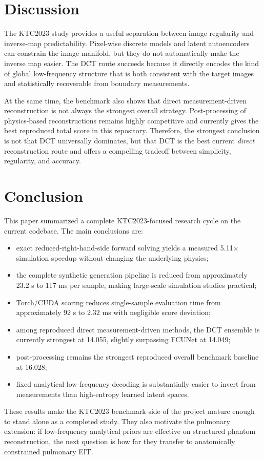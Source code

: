\documentclass[11pt,a4paper]{article}
\begin{document}
\section{Discussion}
The KTC2023 study provides a useful separation between image regularity and inverse-map predictability. Pixel-wise discrete models and latent autoencoders can constrain the image manifold, but they do not automatically make the inverse map easier. The DCT route succeeds because it directly encodes the kind of global low-frequency structure that is both consistent with the target images and statistically recoverable from boundary measurements.

At the same time, the benchmark also shows that direct measurement-driven reconstruction is not always the strongest overall strategy. Post-processing of physics-based reconstructions remains highly competitive and currently gives the best reproduced total score in this repository. Therefore, the strongest conclusion is not that DCT universally dominates, but that DCT is the best current \emph{direct} reconstruction route and offers a compelling tradeoff between simplicity, regularity, and accuracy.

\section{Conclusion}
This paper summarized a complete KTC2023-focused research cycle on the current codebase. The main conclusions are:
\begin{itemize}[leftmargin=1.5em]
    \item exact reduced-right-hand-side forward solving yields a measured 5.11$\times$ simulation speedup without changing the underlying physics;
    \item the complete synthetic generation pipeline is reduced from approximately 23.2 s to 117 ms per sample, making large-scale simulation studies practical;
    \item Torch/CUDA scoring reduces single-sample evaluation time from approximately 92 s to 2.32 ms with negligible score deviation;
    \item among reproduced direct measurement-driven methods, the DCT ensemble is currently strongest at 14.055, slightly surpassing FCUNet at 14.049;
    \item post-processing remains the strongest reproduced overall benchmark baseline at 16.028;
    \item fixed analytical low-frequency decoding is substantially easier to invert from measurements than high-entropy learned latent spaces.
\end{itemize}

These results make the KTC2023 benchmark side of the project mature enough to stand alone as a completed study. They also motivate the pulmonary extension: if low-frequency analytical priors are effective on structured phantom reconstruction, the next question is how far they transfer to anatomically constrained pulmonary EIT.



\end{document}
